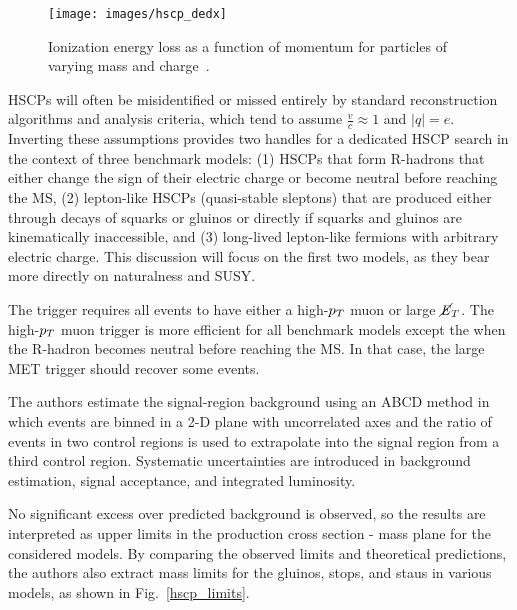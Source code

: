 \documentclass[12pt]{article}
\begin{document}
        \noindent \begin{figure}[htbp] \begin{center}
        \texttt{[image: images/hscp\_dedx]}
        \caption{Ionization energy loss as a function of momentum for particles of varying mass and charge~\cite{cms_hscp}.}
        \label{hscp_dedx}
        \end{center} \end{figure}

        HSCPs will often be misidentified or missed entirely by standard reconstruction algorithms and analysis criteria, which tend to assume $\frac{v}{c} \approx \num{1}$ and $\lvert q \rvert = e$. Inverting these assumptions provides two handles for a dedicated HSCP search in the context of three benchmark models: (1) HSCPs that form R-hadrons that either change the sign of their electric charge or become neutral before reaching the MS, (2) lepton-like HSCPs (quasi-stable sleptons) that are produced either through decays of squarks or gluinos or directly if squarks and gluinos are kinematically inaccessible, and (3) long-lived lepton-like fermions with arbitrary electric charge. This discussion will focus on the first two models, as they bear more directly on naturalness and SUSY.

        The trigger requires all events to have either a high-$p_T$ muon or large $\cancel{\it{E}}_{T}$. The high-$p_T$ muon trigger is more efficient for all benchmark models except the when the R-hadron becomes neutral before reaching the MS. In that case, the large MET trigger should recover some events.

        The authors estimate the signal-region background using an ABCD method in which events are binned in a 2-D plane with uncorrelated axes and the ratio of events in two control regions is used to extrapolate into the signal region from a third control region. Systematic uncertainties are introduced in background estimation, signal acceptance, and integrated luminosity.

        No significant excess over predicted background is observed, so the results are interpreted as upper limits in the production cross section - mass plane for the considered models. By comparing the observed limits and theoretical predictions, the authors also extract mass limits for the gluinos, stops, and staus in various models, as shown in Fig.~\ref{hscp_limits}.
\end{document}
